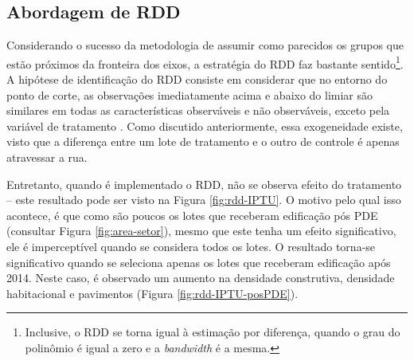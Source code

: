 \subsection{Abordagem de RDD}

Considerando o sucesso da metodologia de assumir como parecidos os grupos que estão próximos da fronteira dos eixos, a estratégia do RDD faz bastante sentido\footnote{Inclusive, o RDD se torna igual à estimação por diferença, quando o grau do polinômio é igual a zero e a \textit{bandwidth} é a mesma.}. A hipótese de identificação do RDD consiste em considerar que no entorno do ponto de corte, as observações imediatamente acima e abaixo do limiar são similares em todas as características observáveis e não observáveis, exceto pela variável de tratamento \cite{Cattaneo2019, Cattaneo2024}. Como discutido anteriormente, essa exogeneidade existe, visto que a diferença entre um lote de tratamento e o outro de controle é apenas atravessar a rua.

Entretanto, quando é implementado o RDD, não se observa efeito do tratamento -- este resultado pode ser visto na Figura \ref{fig:rdd-IPTU}. O motivo pelo qual isso acontece, é que como são poucos os lotes que receberam edificação pós PDE (consultar Figura \ref{fig:area-setor}), mesmo que este tenha um efeito significativo, ele é imperceptível quando se considera todos os lotes. O resultado torna-se significativo quando se seleciona apenas os lotes que receberam edificação após 2014. Neste caso, é observado um aumento na densidade construtiva, densidade habitacional e pavimentos (Figura \ref{fig:rdd-IPTU-posPDE}). 

